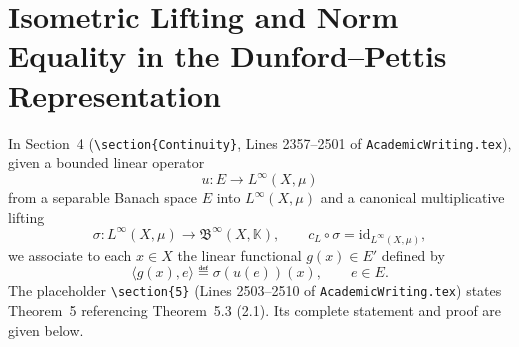 
\section{Isometric Lifting and Norm Equality in the Dunford--Pettis Representation}
\label{sec:completion_section_5}

In Section~4 (\texttt{\textbackslash section\{Continuity\}}, Lines 2357--2501 of \texttt{AcademicWriting.tex}), given a bounded linear operator
\[
  u : E \to L^\infty(X, \mu)
\]
from a separable Banach space $E$ into $L^\infty(X, \mu)$ and a canonical multiplicative lifting
\[
  \sigma : L^\infty(X, \mu) \to \mathfrak{B}^\infty(X, \mathbb{K}),
  \qquad
  c_L \circ \sigma = \mathrm{id}_{L^\infty(X, \mu)},
\]
we associate to each $x \in X$ the linear functional $g(x) \in E'$ defined by
\[
  \langle g(x), e \rangle \eqdef \sigma(u(e))(x), \qquad e \in E.
\]
The placeholder \texttt{\textbackslash section\{5\}} (Lines 2503--2510 of \texttt{AcademicWriting.tex}) states Theorem~5 referencing Theorem~5.3 (2.1). Its complete statement and proof are given below.

